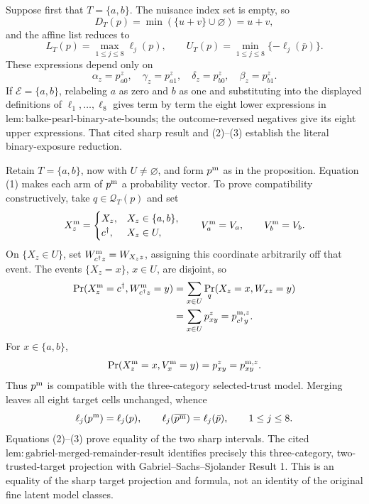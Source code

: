 Suppose first that \(T=\{a,b\}\).  The nuisance index set is empty, so
\[
 D_T(p)=\min(\{u+v\}\cup\varnothing)=u+v,
\]
and the affine list reduces to
\[
 L_T(p)=\max_{1\le j\le8}\ell_j(p),
 \qquad
 U_T(p)=\min_{1\le j\le8}\{-\ell_j(\bar p)\}. \tag{3}
\]
These expressions depend only on
\[
 \alpha_z=p^z_{a0},\quad \gamma_z=p^z_{a1},\quad
 \delta_z=p^z_{b0},\quad \beta_z=p^z_{b1}.
\]
If \(\mathcal E=\{a,b\}\), relabeling \(a\) as zero and \(b\) as one and
substituting into the displayed definitions of \(\ell_1,\ldots,\ell_8\)
gives term by term the eight lower expressions in
\(\mathrm{lem{:}balke\mbox{-}pearl\mbox{-}binary\mbox{-}ate\mbox{-}bounds}\);
the outcome-reversed negatives give its eight upper expressions.  That
cited sharp result and (2)--(3) establish the literal binary-exposure
reduction.

Retain \(T=\{a,b\}\), now with \(U\ne\varnothing\), and form \(p^{\rm m}\)
as in the proposition.  Equation (1) makes each arm of \(p^{\rm m}\) a
probability vector.  To prove compatibility constructively, take
\(q\in\mathcal Q_T(p)\) and set
\[
 X_z^{\rm m}=\begin{cases}
 X_z,&X_z\in\{a,b\},\\
 c^\dagger,&X_z\in U,
 \end{cases}
 \qquad V_a^{\rm m}=V_a,
 \qquad V_b^{\rm m}=V_b.
\]
On \(\{X_z\in U\}\), set
\(W^{\rm m}_{c^\dagger z}=W_{X_z z}\), assigning this coordinate
arbitrarily off that event.  The events \(\{X_z=x\}\), \(x\in U\), are
disjoint, so
\[
\begin{aligned}
 \Pr(X_z^{\rm m}=c^\dagger,W^{\rm m}_{c^\dagger z}=y)
 &=\sum_{x\in U}\Pr_q(X_z=x,W_{xz}=y)\\
 &=\sum_{x\in U}p^z_{xy}=p^{{\rm m},z}_{c^\dagger y}.
\end{aligned}
\]
For \(x\in\{a,b\}\),
\[
 \Pr(X_z^{\rm m}=x,V_x^{\rm m}=y)=p^z_{xy}=p^{{\rm m},z}_{xy}.
\]
Thus \(p^{\rm m}\) is compatible with the three-category selected-trust
model.  Merging leaves all eight target cells unchanged, whence
\[
 \ell_j(p^{\rm m})=\ell_j(p),
 \qquad
 \ell_j(\overline{p^{\rm m}})=\ell_j(\bar p),
 \qquad 1\le j\le8.
\]
Equations (2)--(3) prove equality of the two sharp intervals.  The cited
\(\mathrm{lem{:}gabriel\mbox{-}merged\mbox{-}remainder\mbox{-}result}\)
identifies precisely this three-category, two-trusted-target projection with
Gabriel--Sachs--Sjolander Result 1.  This is an equality of the sharp target
projection and formula, not an identity of the original fine latent model
classes.

